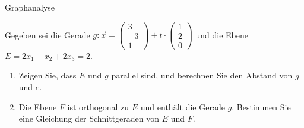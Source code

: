 \aufgabe{}
Graphanalyse
\loesung{}

Gegeben sei die Gerade $g: \vec x=\left(\begin{array}{c} 3 \\ -3 \\ 1 \end{array}\right) + t\cdot \left( \begin{array}{c} 1 \\ 2 \\ 0 \end{array} \right)$ und die Ebene $E = 2x_1-x_2+2x_3=2$.
\begin{enumerate}
  \item Zeigen Sie, dass $E$ und $g$ parallel sind, und berechnen Sie den Abstand von $g$ und $e$.
  \item Die Ebene $F$ ist orthogonal zu $E$ und enthält die Gerade $g$. Bestimmen Sie eine Gleichung der Schnittgeraden von $E$ und $F$.
\end{enumerate}
\loesung{}
